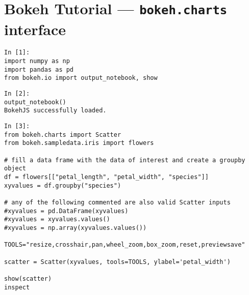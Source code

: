 \section{Bokeh Tutorial — \texttt{bokeh.charts} interface}
\begin{framed}
	\begin{verbatim}
In [1]:
import numpy as np
import pandas as pd
from bokeh.io import output_notebook, show
\end{verbatim}
\end{framed}
\begin{framed}
\begin{verbatim}
In [2]:
output_notebook()
BokehJS successfully loaded.
\end{verbatim}
\end{framed}
\begin{framed}
	\begin{verbatim}
In [3]:
from bokeh.charts import Scatter
from bokeh.sampledata.iris import flowers

# fill a data frame with the data of interest and create a groupby object
df = flowers[["petal_length", "petal_width", "species"]]
xyvalues = df.groupby("species")

# any of the following commented are also valid Scatter inputs
#xyvalues = pd.DataFrame(xyvalues)
#xyvalues = xyvalues.values()
#xyvalues = np.array(xyvalues.values())

TOOLS="resize,crosshair,pan,wheel_zoom,box_zoom,reset,previewsave"

scatter = Scatter(xyvalues, tools=TOOLS, ylabel='petal_width')

show(scatter)
inspect 
\end{verbatim}
\end{framed}
